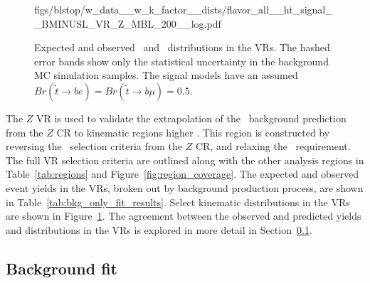 \begin{figure}[t!]
{    %
      {figs/blstop/w_data__w_k_factor__dists/flavor_all__ht_signal__BMINUSL_VR_Z_MBL_200__log.pdf}
  }
  \caption[
    Expected and observed \MBL\ and \HT\ distributions in the
    VRs.
  ]{
    Expected and observed \MBL\ and \HT\ distributions in the
    VRs.
    The hashed error bands show only the statistical uncertainty in the
    background MC simulation samples.
    The signal models have an assumed
    $Br(\tilde{t}\rightarrow be) = Br(\tilde{t}\rightarrow b\mu) = 0.5$.
  }
  \label{fig:vr_dists_w_norm_factor}
\end{figure}

The $Z$ VR is used to validate the extrapolation of the \ZGAMMAJETS\ background
prediction from the $Z$ CR to kinematic regions higher \HT.
This region is constructed by reversing the \HT\ selection criteria from the
$Z$ CR, and relaxing the \METSIG\ requirement.
The full VR selection criteria are outlined along with the other analysis
regions in Table~\ref{tab:regions} and Figure~\ref{fig:region_coverage}.
The expected and observed event yields in the VRs, broken out by background
production process, are shown in Table~\ref{tab:bkg_only_fit_results}.
Select kinematic distributions in the VRs are shown in
Figure~\ref{fig:vr_dists_w_norm_factor}.
The agreement between the observed and predicted yields and distributions in the
VRs is explored in more detail in Section~\ref{sec:bkg_fit}.


\FloatBarrier
\subsection{Background fit}
\label{sec:bkg_fit}


